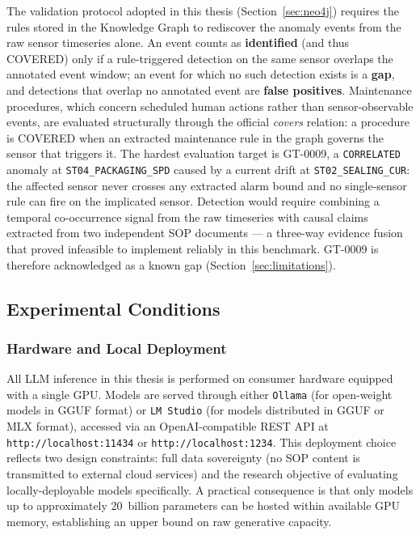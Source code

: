 ﻿\documentclass[11pt]{article}
\begin{document}
The validation protocol adopted in this thesis
(Section~\ref{sec:neo4j}) requires the rules stored in the Knowledge Graph
to rediscover the anomaly events from the raw sensor timeseries alone.
An event counts as \textbf{identified} (and thus COVERED) only if a
rule-triggered detection on the same sensor overlaps the annotated event
window; an event for which no such detection exists is a \textbf{gap}, and
detections that overlap no annotated event are \textbf{false positives}.
Maintenance procedures, which concern scheduled human actions rather than
sensor-observable events, are evaluated structurally through the official
\emph{covers} relation: a procedure is COVERED when an extracted
maintenance rule in the graph governs the sensor that triggers it.
The hardest evaluation target is GT-0009, a \texttt{CORRELATED} anomaly at
\texttt{ST04\_PACKAGING\_SPD} caused by a current drift at
\texttt{ST02\_SEALING\_CUR}: the affected sensor never crosses any extracted
alarm bound and no single-sensor rule can fire on the implicated sensor.
Detection would require combining a temporal co-occurrence signal from the
raw timeseries with causal claims extracted from two independent SOP
documents — a three-way evidence fusion that proved infeasible to implement
reliably in this benchmark.
GT-0009 is therefore acknowledged as a known gap (Section~\ref{sec:limitations}).

\subsection{Experimental Conditions}
\label{sec:experimental_conditions}

\subsubsection{Hardware and Local Deployment}
All LLM inference in this thesis is performed on consumer hardware equipped
with a single GPU.
Models are served through either \texttt{Ollama} (for open-weight models in
GGUF format) or \texttt{LM Studio} (for models distributed in GGUF or MLX
format), accessed via an OpenAI-compatible REST API at
\texttt{http://localhost:11434} or \texttt{http://localhost:1234}.
This deployment choice reflects two design constraints: full data sovereignty
(no SOP content is transmitted to external cloud services) and the research
objective of evaluating locally-deployable models specifically.
A practical consequence is that only models up to approximately 20~billion
parameters can be hosted within available GPU memory, establishing an upper
bound on raw generative capacity.
\end{document}
